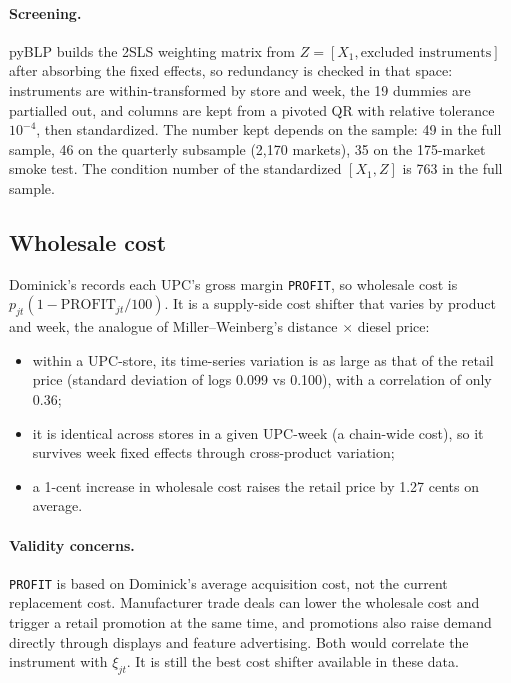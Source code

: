 \documentclass[11pt]{article}
\newcommand{\code}[1]{\texttt{#1}}
\begin{document}
\paragraph{Screening.} pyBLP builds the 2SLS weighting matrix from
$Z = [X_1, \text{excluded instruments}]$ after absorbing the fixed effects, so redundancy is
checked in that space: instruments are within-transformed by store and week, the 19 dummies are
partialled out, and columns are kept from a pivoted QR with relative tolerance $10^{-4}$, then
standardized. The number kept depends on the sample: 49 in the full sample, 46 on the quarterly
subsample (2,170 markets), 35 on the 175-market smoke test. The condition number of the
standardized $[X_1, Z]$ is 763 in the full sample.

\subsection{Wholesale cost}\label{sec:wcost}

Dominick's records each UPC's gross margin \code{PROFIT}, so wholesale cost is
$p_{jt}(1 - \text{PROFIT}_{jt}/100)$. It is a supply-side cost shifter that varies by product
and week, the analogue of Miller--Weinberg's distance $\times$ diesel price:
\begin{itemize}
  \item within a UPC-store, its time-series variation is as large as that of the retail price
        (standard deviation of logs 0.099 vs 0.100), with a correlation of only 0.36;
  \item it is identical across stores in a given UPC-week (a chain-wide cost), so it survives
        week fixed effects through cross-product variation;
  \item a 1-cent increase in wholesale cost raises the retail price by 1.27 cents on average.
\end{itemize}

\paragraph{Validity concerns.} \code{PROFIT} is based on Dominick's average acquisition cost,
not the current replacement cost. Manufacturer trade deals can lower the wholesale cost and
trigger a retail promotion at the same time, and promotions also raise demand directly through
displays and feature advertising. Both would correlate the instrument with $\xi_{jt}$. It is
still the best cost shifter available in these data.
\end{document}
